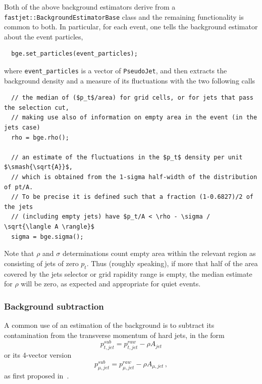 \documentclass[12pt,a4]{article}
\newcommand{\ttt}[1]{{\small\texttt{#1}}}
\newcommand{\PJ}{\ttt{PseudoJet}\xspace}
\begin{document}
Both of the above background estimators derive from a
\ttt{fastjet::BackgroundEstimatorBase} class and the remaining
functionality is common to both.
%
In particular, for each event, one tells the background estimator
about the event particles,
\begin{lstlisting}
  bge.set_particles(event_particles);
\end{lstlisting}
where \ttt{event\_particles} is a vector of \PJ, and then extracts the
background density and a measure of its fluctuations with the two
following calls 
%
\begin{lstlisting}
  // the median of ($p_t$/area) for grid cells, or for jets that pass the selection cut, 
  // making use also of information on empty area in the event (in the jets case)
  rho = bge.rho(); 

  // an estimate of the fluctuations in the $p_t$ density per unit $\smash{\sqrt{A}}$,
  // which is obtained from the 1-sigma half-width of the distribution of pt/A.
  // To be precise it is defined such that a fraction (1-0.6827)/2 of the jets
  // (including empty jets) have $p_t/A < \rho - \sigma / \sqrt{\langle A \rangle}$
  sigma = bge.sigma(); 
\end{lstlisting}
Note that $\rho$ and $\sigma$ determinations count empty area within
the relevant region as consisting of jets of zero $p_t$.
%
Thus (roughly speaking), if more that half of the area covered by the
jets selector or grid rapidity range is empty, the median estimate for
$\rho$ will be zero, as expected and appropriate for quiet events.


\subsubsection{Background subtraction}\label{sec:subtractor}

A common use of an estimation of the background is to subtract its contamination 
from the
transverse momentum of hard jets, in the form
\begin{equation}
  \label{eq:BGE-scalar-pt}
  p_{t,jet}^{sub} = p_{t,jet}^{raw} - \rho A_{jet} 
\end{equation}
or its 4-vector version
\begin{equation}
  \label{eq:BGE-4vector-massless}
  p_{\mu,jet}^{sub} = p_{\mu,jet}^{raw} - \rho A_{\mu,jet} \, ,
\end{equation}
as first proposed in~\cite{cs}.
\end{document}
